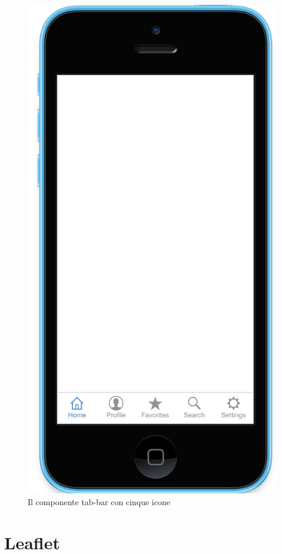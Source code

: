 \begin{figure}[H]
	\centering
	\includegraphics[scale=0.7]{Implementazione/tab-bar.png}
	\caption{Il componente tab-bar con cinque icone}
	\label{fig:tab}
\end{figure}

\newpage
\section{Leaflet}

